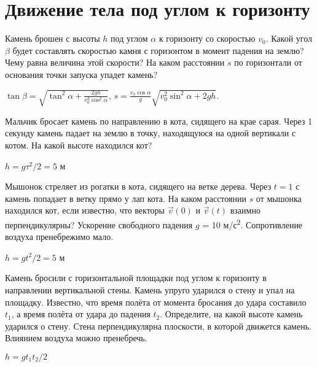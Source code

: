 \section{Движение тела под углом к горизонту}

\begin{ex} 
Камень брошен с высоты $h$ под углом $\alpha$ к горизонту  со скоростью $v_0$. Какой угол $\beta$ будет составлять скоростью камня с горизонтом в момент падения на землю? Чему равна величина этой скорости? На каком расстоянии $s$ по горизонтали от основания точки запуска упадет камень?
\begin{ans}
$\tan \beta = \sqrt{\tan^2 \alpha + \frac{2gh}{v_0^2 \cos^2 \alpha}}$, $s=\frac{v_0 \cos \alpha}{g} \sqrt{v_0^2 \sin^2 \alpha + 2gh}$.
\end{ans}
\end{ex}

\begin{ex}
Мальчик бросает камень по направлению в кота, сидящего на крае сарая. Через 1 секунду камень падает на землю в точку, находящуюся на одной вертикали с котом. На какой высоте находился кот?
\begin{ans}
$h = g\tau^2/2 = 5$ м		
\end{ans}
\end{ex}	

\begin{ex} 
Мышонок стреляет из рогатки в кота, сидящего на ветке дерева. Через $t = 1$ с камень попадает в ветку прямо у лап кота. На каком расстоянии $s$ от мышонка находился кот, если известно, что векторы $\vec v(0)$ и $\vec v(t)$ взаимно перпендикулярны? 
Ускорение свободного падения $g$ = 10 м/с\textsuperscript{2}. Сопротивление воздуха пренебрежимо мало.
\begin{ans}
$h = gt^2/2 = 5$ м
\end{ans}
\end{ex}

\begin{ex}
Камень бросили с горизонтальной площадки под углом к горизонту в направлении вертикальной стены. Камень упруго ударился о стену и упал на площадку. Известно, что время полёта от момента бросания до удара составило $t_1$, а время полёта от удара до падения $t_2$. Определите, на какой высоте камень ударился о стену. Стена перпендикулярна плоскости, в которой движется камень. Влиянием воздуха можно пренебречь.
\begin{ans}
$h = gt_1t_2/2$
\end{ans}
\end{ex}

